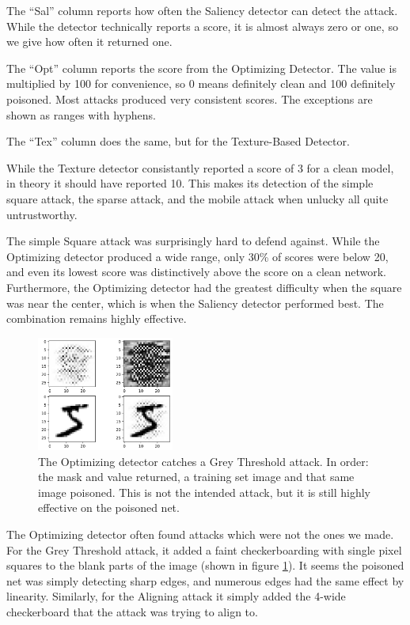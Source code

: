 \documentclass[letterpaper, 10 pt, conference]{ieeeconf}  %
\begin{document}
The ``Sal'' column reports how often the Saliency detector can
detect the attack.  While the detector technically reports a score, it
is almost always zero or one, so we give how often it returned one.

The ``Opt'' column reports the score from the Optimizing
Detector.  The value is multiplied by 100 for convenience, so 0 means
definitely clean and 100 definitely poisoned.  Most attacks produced
very consistent scores.  The exceptions are shown as ranges with
hyphens.

The ``Tex'' column does the same, but for the Texture-Based
Detector.

While the Texture detector consistantly reported a score of 3 for a
clean model, in theory it should have reported 10.  This makes its
detection of the simple square attack, the sparse attack, and the
mobile attack when unlucky all quite untrustworthy.

The simple Square attack was surprisingly hard to defend against.
While the Optimizing detector produced a wide range, only 30\% of
scores were below 20, and even its lowest score was distinctively
above the score on a clean network.  Furthermore, the Optimizing
detector had the greatest difficulty when the square was near the
center, which is when the Saliency detector performed best.  The
combination remains highly effective.

\begin{figure}[b]
\centering
\includegraphics[width=0.4\textwidth]{catch_grey.png}
\caption{The Optimizing detector catches a Grey Threshold attack.  In
  order: the mask and value returned, a training set image and that
  same image poisoned.  This is not the intended attack, but it is
  still highly effective on the poisoned net.}
\label{catchgrey}
\end{figure}


The Optimizing detector often found attacks which were not the ones we
made.  For the Grey Threshold attack, it added a faint checkerboarding
with single pixel squares to the blank parts of the image (shown in
figure \ref{catchgrey}).  It seems
the poisoned net was simply detecting sharp edges, and numerous edges
had the same effect by linearity.  Similarly, for the Aligning attack
it simply added the 4-wide checkerboard that the attack was trying to
align to.
\end{document}
